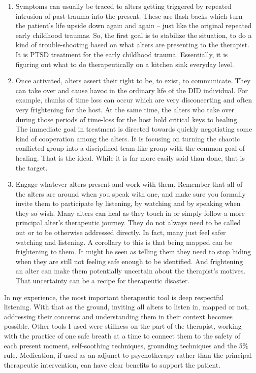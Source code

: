 \documentclass[]{book}
\begin{document}
\begin{enumerate}
\def\labelenumi{\arabic{enumi}.}
\item
  Symptoms can usually be traced to alters getting triggered by repeated intrusion of past trauma into the present. These are flash-backs which turn the patient's life upside down again and again -- just like the original repeated early childhood traumas. So, the first goal is to stabilize the situation, to do a kind of trouble-shooting based on what alters are presenting to the therapist. It is PTSD treatment for the early childhood trauma. Essentially, it is figuring out what to do therapeutically on a kitchen sink everyday level.
\item
  Once activated, alters assert their right to be, to exist, to communicate. They can take over and cause havoc in the ordinary life of the DID individual. For example, chunks of time loss can occur which are very disconcerting and often very frightening for the host. At the same time, the alters who take over during those periods of time-loss for the host hold critical keys to healing. The immediate goal in treatment is directed towards quickly negotiating some kind of cooperation among the alters. It is focusing on turning the chaotic conflicted group into a disciplined team-like group with the common goal of healing. That is the ideal. While it is far more easily said than done, that is the target.
\item
  Engage whatever alters present and work with them. Remember that all of the alters are around when you speak with one, and make sure you formally invite them to participate by listening, by watching and by speaking when they so wish. Many alters can heal as they touch in or simply follow a more principal alter's therapeutic journey. They do not always need to be called out or to be otherwise addressed directly. In fact, many just feel safer watching and listening. A corollary to this is that being mapped can be frightening to them. It might be seen as telling them they need to stop hiding when they are still not feeling safe enough to be identified. And frightening an alter can make them potentially uncertain about the therapist's motives. That uncertainty can be a recipe for therapeutic disaster.
\end{enumerate}

In my experience, the most important therapeutic tool is deep respectful listening. With that as the ground, inviting all alters to listen in, mapped or not, addressing their concerns and understanding them in their context becomes possible. Other tools I used were stillness on the part of the therapist, working with the practice of one safe breath at a time to connect them to the safety of each present moment, self-soothing techniques, grounding techniques and the 5\% rule. Medication, if used as an adjunct to psychotherapy rather than the principal therapeutic intervention, can have clear benefits to support the patient.
\end{document}
